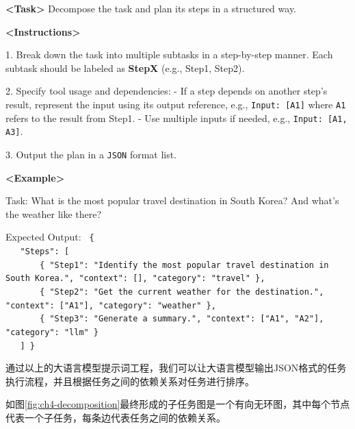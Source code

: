 \begin{table}[htbp]
  \centering
  \label{tab:task-decomposition} %

\begin{tcolorbox}[colback=bgcolor, colframe=black, width=0.95\textwidth, boxrule=0.5mm, 
coltitle=white, colbacktitle=titlecolor, title=Task Decomposition and Response Planning with GPT-4]


\textbf{<Task>} Decompose the task and plan its steps in a structured way. 

\textbf{<Instructions>} 

1. Break down the task into multiple subtasks in a step-by-step manner. Each subtask should be labeled as \textbf{StepX} (e.g., Step1, Step2).  

2. Specify tool usage and dependencies:  
   - If a step depends on another step's result, represent the input using its output reference, e.g., \texttt{Input: [A1]} where \texttt{A1} refers to the result from Step1.  
   - Use multiple inputs if needed, e.g., \texttt{Input: [A1, A3]}.  

3. Output the plan in a \texttt{JSON} format list.  

\textbf{<Example>}  

Task: What is the most popular travel destination in South Korea? And what’s the weather like there?

Expected Output:
\texttt{%
\{ \\
\ \ \ "Steps": [ \\
\ \ \ \ \ \ \ \{ "Step1": "Identify the most popular travel destination in South Korea.", "context": [], "category": "travel" \}, \\
\ \ \ \ \ \ \ \{ "Step2": "Get the current weather for the destination.", "context": ["A1"], "category": "weather" \}, \\
\ \ \ \ \ \ \ \{ "Step3": "Generate a summary.", "context": ["A1", "A2"], "category": "llm" \} \\
\ \ \ ]
\}
}
\end{tcolorbox}
\end{table}


通过以上的大语言模型提示词工程，我们可以让大语言模型输出JSON格式的任务执行流程，并且根据任务之间的依赖关系对任务进行排序。

如图\ref{fig:ch4-decomposition}最终形成的子任务图是一个有向无环图，其中每个节点代表一个子任务，每条边代表任务之间的依赖关系。

